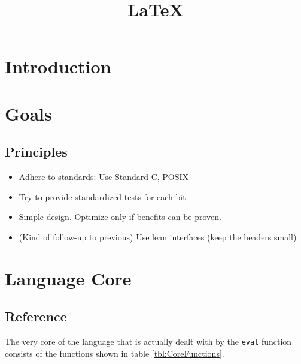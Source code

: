 \documentclass[12pt]{article}
\title{\LaTeX}
\date{}
\begin{document}

\section{Introduction}

\section{Goals}

\subsection{Principles}

\begin{itemize}
    \item Adhere to standards: Use Standard C, POSIX
    \item Try to provide standardized tests for each bit 
    \item Simple design. Optimize only if benefits can be proven.
    \item (Kind of follow-up to previous) Use lean interfaces (keep the headers
        small)
\end{itemize}

\section{Language Core}

\subsection{Reference}

The very core of the language that is actually dealt with by the \texttt{eval}
function consists of the functions shown in table \ref{tbl:CoreFunctions}.
\end{document}
